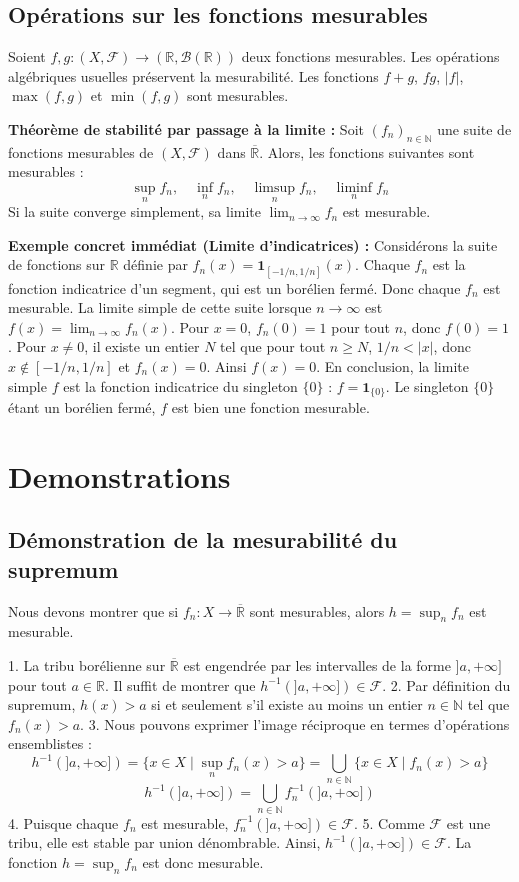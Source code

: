 \documentclass[11pt,a4paper]{article}
\begin{document}
\subsection*{Opérations sur les fonctions mesurables}

Soient $f, g : (X, \mathcal{F}) \to (\mathbb{R}, \mathcal{B}(\mathbb{R}))$ deux fonctions mesurables.
Les opérations algébriques usuelles préservent la mesurabilité. Les fonctions $f+g$, $fg$, $|f|$, $\max(f, g)$ et $\min(f, g)$ sont mesurables.

\textbf{Théorème de stabilité par passage à la limite :}
Soit $(f_n)_{n \in \mathbb{N}}$ une suite de fonctions mesurables de $(X, \mathcal{F})$ dans $\overline{\mathbb{R}}$. Alors, les fonctions suivantes sont mesurables :
$$ \sup_{n} f_n, \quad \inf_{n} f_n, \quad \limsup_{n} f_n, \quad \liminf_{n} f_n $$
Si la suite converge simplement, sa limite $\lim_{n \to \infty} f_n$ est mesurable.


\textbf{Exemple concret immédiat (Limite d'indicatrices) :}
Considérons la suite de fonctions sur $\mathbb{R}$ définie par $f_n(x) = \mathbf{1}_{[-1/n, 1/n]}(x)$.
Chaque $f_n$ est la fonction indicatrice d'un segment, qui est un borélien fermé. Donc chaque $f_n$ est mesurable.
La limite simple de cette suite lorsque $n \to \infty$ est $f(x) = \lim_{n \to \infty} f_n(x)$.
Pour $x = 0$, $f_n(0) = 1$ pour tout $n$, donc $f(0) = 1$.
Pour $x \neq 0$, il existe un entier $N$ tel que pour tout $n \geq N$, $1/n < |x|$, donc $x \notin [-1/n, 1/n]$ et $f_n(x) = 0$. Ainsi $f(x) = 0$.
En conclusion, la limite simple $f$ est la fonction indicatrice du singleton $\{0\}$ : $f = \mathbf{1}_{\{0\}}$.
Le singleton $\{0\}$ étant un borélien fermé, $f$ est bien une fonction mesurable.


\section{Demonstrations}

\subsection*{Démonstration de la mesurabilité du supremum}

Nous devons montrer que si $f_n : X \to \overline{\mathbb{R}}$ sont mesurables, alors $h = \sup_n f_n$ est mesurable.

1. La tribu borélienne sur $\overline{\mathbb{R}}$ est engendrée par les intervalles de la forme $]a, +\infty]$ pour tout $a \in \mathbb{R}$. Il suffit de montrer que $h^{-1}(]a, +\infty]) \in \mathcal{F}$.
2. Par définition du supremum, $h(x) > a$ si et seulement s'il existe au moins un entier $n \in \mathbb{N}$ tel que $f_n(x) > a$.
3. Nous pouvons exprimer l'image réciproque en termes d'opérations ensemblistes :
   $$ h^{-1}(]a, +\infty]) = \{ x \in X \mid \sup_n f_n(x) > a \} = \bigcup_{n \in \mathbb{N}} \{ x \in X \mid f_n(x) > a \} $$
   $$ h^{-1}(]a, +\infty]) = \bigcup_{n \in \mathbb{N}} f_n^{-1}(]a, +\infty]) $$
4. Puisque chaque $f_n$ est mesurable, $f_n^{-1}(]a, +\infty]) \in \mathcal{F}$.
5. Comme $\mathcal{F}$ est une tribu, elle est stable par union dénombrable. Ainsi, $h^{-1}(]a, +\infty]) \in \mathcal{F}$.
La fonction $h = \sup_n f_n$ est donc mesurable.
\end{document}
